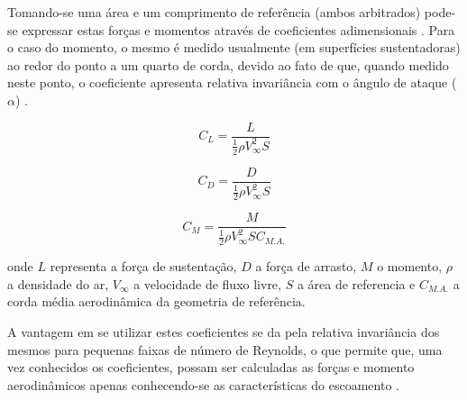 Tomando-se uma área e um comprimento de referência (ambos arbitrados) pode-se expressar estas forças e momentos através de coeficientes adimensionais  \citep{anderson1984fundamentals}. Para o caso do momento, o mesmo é medido usualmente (em superfícies sustentadoras) ao redor do ponto a um quarto de corda, devido ao fato de que, quando medido neste ponto, o coeficiente apresenta relativa invariância com o ângulo de ataque ($\alpha$) \citep{abbott1959theory}. 

\begin{equation}
    C_L =  \frac{L}{ \frac{1}{2} \rho V_{\infty}^{2} S}
\end{equation}

\begin{equation} 
    C_D =  \frac{D}{ \frac{1}{2} \rho V_{\infty}^{2} S}
\end{equation}

\begin{equation}
    C_M =  \frac{M}{ \frac{1}{2} \rho V_{\infty}^{2} S C_{M.A.}}
\end{equation}

onde $L$ representa a força de sustentação, $D$ a força de arrasto, $M$ o momento, $\rho$ a densidade do ar, $V_{\infty}$ a velocidade de fluxo livre, $S$ a área de referencia e $C_{M.A.}$ a corda média aerodinâmica da geometria de referência.

A vantagem em se utilizar estes coeficientes se da pela relativa invariância dos mesmos para pequenas faixas de número de Reynolds, o que permite que, uma vez conhecidos os coeficientes, possam ser calculadas as forças e momento aerodinâmicos apenas conhecendo-se as características do escoamento \citep{anderson1984fundamentals}.

